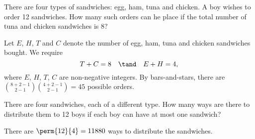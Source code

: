 \begin{problem}
    There are four types of sandwiches: egg, ham, tuna and chicken. A boy wishes to order 12 sandwiches. How many such orders can he place if the total number of tuna and chicken sandwiches is 8?
\end{problem}
\begin{solution}
    Let $E$, $H$, $T$ and $C$ denote the number of egg, ham, tuna and chicken sandwiches bought. We require \[T + C = 8 \quad \tand \quad E + H = 4,\] where $E$, $H$, $T$, $C$ are non-negative integers. By bars-and-stars, there are $\binom{8+2-1}{2-1} \binom{4+2-1}{2-1} = 45$ possible orders.
\end{solution}

\begin{problem}
    There are four sandwiches, each of a different type. How many ways are there to distribute them to 12 boys if each boy can have at most one sandwich?
\end{problem}
\begin{solution}
    There are $\perm{12}{4} = 11880$ ways to distribute the sandwiches.
\end{solution}